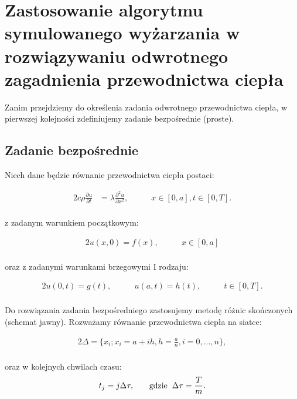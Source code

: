 \documentclass[twoside]{projektInzynierskiMS1}
\newcommand{\si}{ś}
\begin{document}
\section[Odwrotne zagadnienie przewodnictwa ciepła]{Zastosowanie algorytmu symulowanego wyżarzania w rozwiązywaniu odwrotnego zagadnienia przewodnictwa ciepła}

Zanim przejdziemy do określenia zadania odwrotnego przewodnictwa ciepła, w pierwszej kolejności zdefiniujemy zadanie bezpośrednie (proste).

\subsection{Zadanie bezpo\si rednie}
Niech dane będzie równanie przewodnictwa ciepła postaci:

\begin{alignat*}{2}
c\rho \frac{\partial u}{\partial t}&= \lambda \frac{\partial^2 u}{\partial x^2},&\qquad  x \in [0, a], t \in [0, T].\\
\end{alignat*}

z zadanym warunkiem początkowym:

\begin{alignat*}{2}
u(x, 0) = f(x),&\qquad  x \in [0, a]\\
\end{alignat*}

oraz z zadanymi warunkami brzegowymi I rodzaju:

\begin{alignat*}{2}
u(0,t) = g(t),&\qquad  u(a, t) = h(t), &\qquad t \in [0, T].\\
\end{alignat*}

Do rozwiązania zadania bezpośredniego zastosujemy metodę różnic skończonych (schemat jawny).
Rozważamy równanie przewodnictwa ciepła na siatce:

\begin{alignat*}{2}
\Delta = \{ x_i; x_i = a + ih, h = \frac{a}{n},  i=0, ..., n\},\\
\end{alignat*}

oraz w kolejnych chwilach czasu:
\begin{alignat*}{2}
t_j = j \Delta \tau, &\qquad \textrm{gdzie} \hspace{0.2cm} \Delta \tau = \frac{T}{m}.\\
\end{alignat*}
\end{document}
